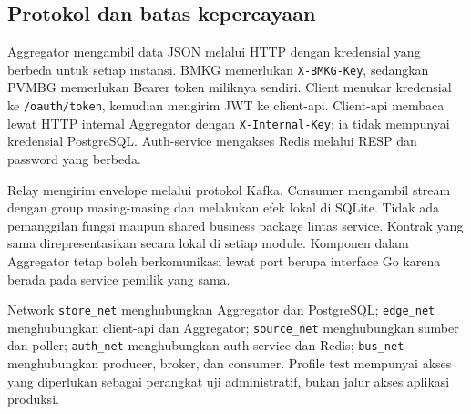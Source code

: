 \subsection{Protokol dan batas kepercayaan}
Aggregator mengambil data JSON melalui HTTP dengan kredensial yang berbeda untuk setiap instansi. BMKG memerlukan \texttt{X-BMKG-Key}, sedangkan PVMBG memerlukan Bearer token miliknya sendiri. Client menukar kredensial ke \texttt{/oauth/token}, kemudian mengirim JWT ke client-api. Client-api membaca lewat HTTP internal Aggregator dengan \texttt{X-Internal-Key}; ia tidak mempunyai kredensial PostgreSQL. Auth-service mengakses Redis melalui RESP dan password yang berbeda.

Relay mengirim envelope melalui protokol Kafka. Consumer mengambil stream dengan group masing-masing dan melakukan efek lokal di SQLite. Tidak ada pemanggilan fungsi maupun shared business package lintas service. Kontrak yang sama direpresentasikan secara lokal di setiap module. Komponen dalam Aggregator tetap boleh berkomunikasi lewat port berupa interface Go karena berada pada service pemilik yang sama.

Network \texttt{store\_net} menghubungkan Aggregator dan PostgreSQL; \texttt{edge\_net} menghubungkan client-api dan Aggregator; \texttt{source\_net} menghubungkan sumber dan poller; \texttt{auth\_net} menghubungkan auth-service dan Redis; \texttt{bus\_net} menghubungkan producer, broker, dan consumer. Profile test mempunyai akses yang diperlukan sebagai perangkat uji administratif, bukan jalur akses aplikasi produksi.
